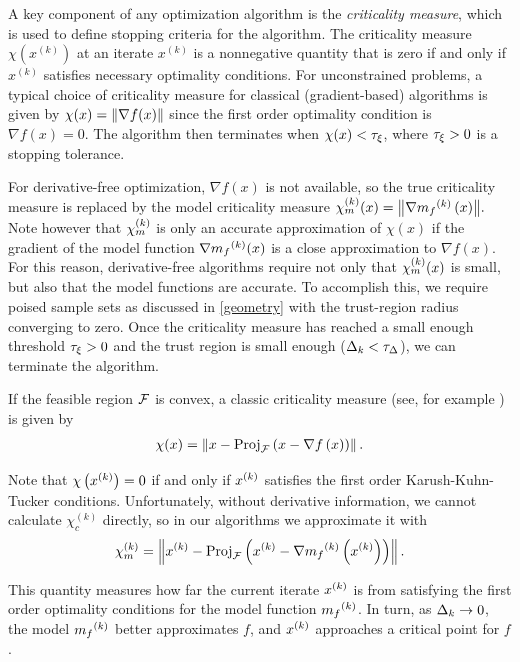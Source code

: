 \documentclass{article}
\begin{document}
A key component of any optimization algorithm is the {\em criticality measure}, which is used to define stopping criteria for the algorithm.
The criticality measure $\chi(x^{(k)})$ at an iterate $x^{(k)}$ is a nonnegative quantity that is zero if and only if $x^{(k)}$ satisfies necessary optimality conditions.
For unconstrained problems,  a typical choice of criticality measure for classical (gradient-based) algorithms is given by $\chi(x) = {\left\|\nabla f(x)\right\|}$
since the first order optimality condition is $\nabla f(x)=0$.
The algorithm then terminates when $\chi(x) < \tau_{\xi}$, where $\tau_{\xi} >0$ is a stopping tolerance.

For derivative-free optimization,  $\nabla f(x)$ is not available,  so the true criticality measure is replaced by the model criticality measure
${\chi_m^{(k)}}(x) = {\left\|\nabla {{m}_f}^{(k)}\left(x\right)\right\|}.$
Note however that ${\chi_m^{(k)}}$ is only an accurate approximation of $\chi(x)$ if the gradient of the model function $\nabla {{m}_f}^{(k)}(x)$ is a close approximation to $\nabla f(x)$.
For this reason, derivative-free algorithms require not only that ${\chi_m^{(k)}}(x)$ is small, but also that the model functions are accurate.
To accomplish this, we require poised sample sets as discussed in \cref{geometry} with the trust-region radius converging to zero.
Once the criticality measure has reached a small enough threshold $\tau_{\xi} > 0$ and the trust region is small enough ($\Delta_k < \tau_{\Delta}$),
we can terminate the algorithm.



If the feasible region ${\mathcal F}$ is convex, a classic criticality measure (see, for example \cite{Conejo:2013:GCT:2620806.2621814} \cite{Conn:2000:TM:357813}) is given by
\begin{align*}
\chi(x) = \left\|x - {\textrm{Proj}}_{{\mathcal F}}\left(x- \nabla f\left(x\right)\right)\right\|.
\end{align*}

Note that $\chi\left(x^{(k)}\right) = 0$ if and only if $x^{(k)}$ satisfies the first order Karush-Kuhn-Tucker conditions.
Unfortunately,  without derivative information, we cannot calculate $\chi_c^{(k)}$ directly,
so in our algorithms we approximate it with
\begin{align}
\label{define_criticality_measure}
{\chi_m^{(k)}} = \left\|x^{(k)} - {\textrm{Proj}}_{{\mathcal F}}\left(x^{(k)}- \nabla {{m}_f}^{(k)}\left(x^{(k)}\right)\right)\right\|.
\end{align}

This quantity measures how far the current iterate $x^{(k)}$ is from satisfying the first order optimality conditions for the model function ${{m}_f}^{(k)}$.
In turn, as $\Delta_k \to 0$, the model ${{m}_f}^{(k)}$ better approximates $f$,  and $x^{(k)}$ approaches a critical point for $f$.
\end{document}
